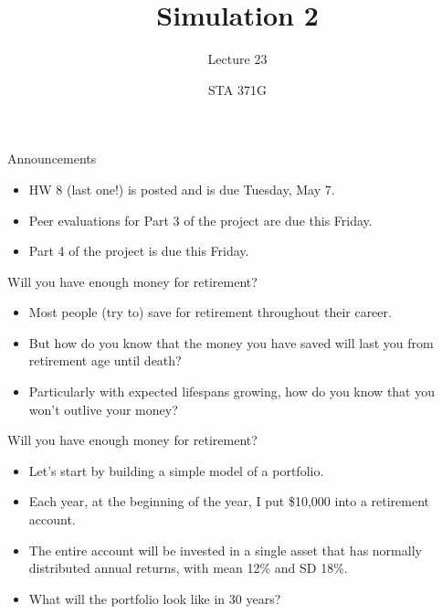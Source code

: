 \documentclass{beamer}\usepackage[]{graphicx}\usepackage[]{color}
\title{Simulation 2}
\subtitle{Lecture 23}
\author{STA 371G}
\begin{document}
  
  

  \frame{\maketitle}



  \begin{darkframes}
    \begin{frame}{Announcements}
      \begin{itemize}
        \item HW 8 (last one!) is posted and is due Tuesday, May 7.
        \item Peer evaluations for Part 3 of the project are due this Friday.
        \item Part 4 of the project is due this Friday.
      \end{itemize}
    \end{frame}

    \begin{frame}{Will you have enough money for retirement?}
      \begin{itemize}[<+->]
        \item Most people (try to) save for retirement throughout their career.
        \item But how do you know that the money you have saved will last you from retirement age until death?
        \item Particularly with expected lifespans growing, how do you know that you won't outlive your money?
      \end{itemize}
    \end{frame}

    \begin{frame}{Will you have enough money for retirement?}
      \begin{itemize}[<+->]
        \item Let's start by building a simple model of a portfolio.
        \item Each year, at the beginning of the year, I put \$10,000 into a retirement account.
        \item The entire account will be invested in a single asset that has normally distributed annual returns, with mean 12\% and SD 18\%.
        \item What will the portfolio look like in 30 years?
      \end{itemize}
    \end{frame}


\end{darkframes}
\end{document}
